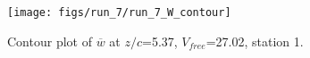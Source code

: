 \begin{figure}[H]
\centering
\texttt{[image: figs/run\_7/run\_7\_W\_contour]}
\caption{Contour plot of $\overline{w}$ at $z/c$=5.37, $V_{free}$=27.02, station 1.}
\label{fig:run_7_W_contour}
\end{figure}


